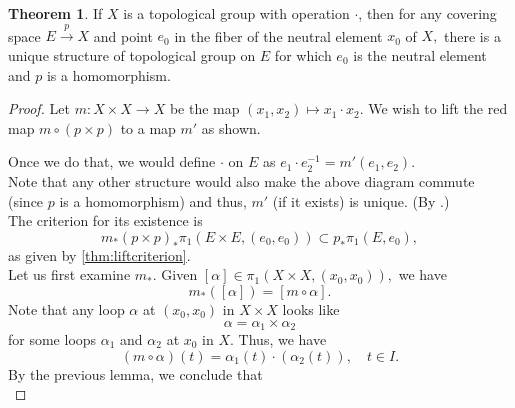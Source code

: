 \documentclass[12pt]{article}
\theoremstyle{definition}
\newtheorem{thm}{Theorem}
\numberwithin{thm}{section}
\begin{document}
\begin{thm}
	If $X$ is a topological group with operation $\cdot$, then for any covering space $E \overset{p}{\longrightarrow} X$ and point $e_0$ in the fiber of the neutral element $x_0$ of $X,$ there is a unique structure of topological group on $E$ for which $e_0$ is the neutral element and $p$ is a homomorphism.
\end{thm}
\begin{proof} 
	Let $m:X\times X \to X$ be the map $(x_1, x_2) \mapsto x_1\cdot x_2.$ We wish to lift the red map $m\circ(p \times p)$ to a map $m'$ as shown.
	\begin{center}
	\end{center}
	Once we do that, we would define $\cdot$ on $E$ as $e_1\cdot e_2^{-1} = m'(e_1, e_2).$ \\
	Note that any other structure would also make the above diagram commute (since $p$ is a homomorphism) and thus, $m'$ (if it exists) is unique. (By .)\\
	The criterion for its existence is 
	\begin{equation*} 
		m_*(p \times p)_*\pi_1(E \times E, (e_0, e_0)) \subset p_*\pi_1(E, e_0),
	\end{equation*}
	as given by \cref{thm:liftcriterion}.\\
	Let us first examine $m_*.$ Given $[\alpha] \in \pi_1(X\times X, (x_0, x_0)),$ we have
	\begin{equation*} 
		m_*([\alpha]) = [m \circ \alpha].
	\end{equation*}
	Note that any loop $\alpha$ at $(x_0, x_0)$ in $X \times X$ looks like
	\begin{equation*} 
		\alpha = \alpha_1 \times \alpha_2
	\end{equation*}
	for some loops $\alpha_1$ and $\alpha_2$ at $x_0$ in $X.$ Thus, we have
	\begin{equation*} 
		(m\circ\alpha)(t) = \alpha_1(t)\cdot(\alpha_2(t)), \quad t \in I.	
	\end{equation*}
	By the previous lemma, we conclude that
	\begin{equation*} 

\end{equation*}
\end{proof}
\end{document}
